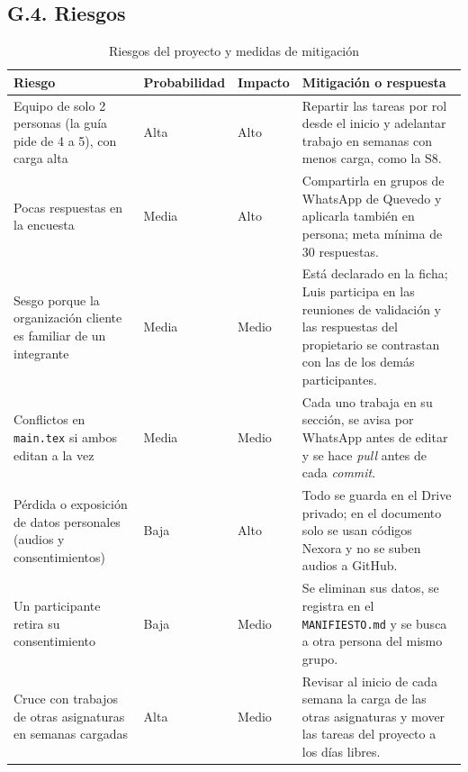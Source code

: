 \documentclass[11pt,a4paper]{article}
\renewcommand{\arraystretch}{1.22}
\begin{document}
\subsection*{G.4. Riesgos}
\begin{table}[H]
\centering
\caption{Riesgos del proyecto y medidas de mitigaci\'on}
\label{tab:riesgos}
\footnotesize
\renewcommand{\arraystretch}{1.12}
\begin{tabularx}{\textwidth}{|L{4.1cm}|C{1.9cm}|C{1.3cm}|Y|}
\hline
{}
\textbf{Riesgo} & \textbf{Probabilidad} & \textbf{Impacto} & \textbf{Mitigaci\'on o respuesta} \\
\hline
Equipo de solo 2 personas (la gu\'ia pide de 4 a 5), con carga alta & Alta & Alto & Repartir las tareas por rol desde el inicio y adelantar trabajo en semanas con menos carga, como la S8. \\
\hline
Pocas respuestas en la encuesta & Media & Alto & Compartirla en grupos de WhatsApp de Quevedo y aplicarla tambi\'en en persona; meta m\'inima de 30 respuestas. \\
\hline
Sesgo porque la organizaci\'on cliente es familiar de un integrante & Media & Medio & Est\'a declarado en la ficha; Luis participa en las reuniones de validaci\'on y las respuestas del propietario se contrastan con las de los dem\'as participantes. \\
\hline
Conflictos en \texttt{main.tex} si ambos editan a la vez & Media & Medio & Cada uno trabaja en su secci\'on, se avisa por WhatsApp antes de editar y se hace \emph{pull} antes de cada \emph{commit}. \\
\hline
P\'erdida o exposici\'on de datos personales (audios y consentimientos) & Baja & Alto & Todo se guarda en el Drive privado; en el documento solo se usan c\'odigos Nexora y no se suben audios a GitHub. \\
\hline
Un participante retira su consentimiento & Baja & Medio & Se eliminan sus datos, se registra en el \texttt{MANIFIESTO.md} y se busca a otra persona del mismo grupo. \\
\hline
Cruce con trabajos de otras asignaturas en semanas cargadas & Alta & Medio & Revisar al inicio de cada semana la carga de las otras asignaturas y mover las tareas del proyecto a los d\'ias libres. \\
\hline
\end{tabularx}
\end{table}

\end{document}
